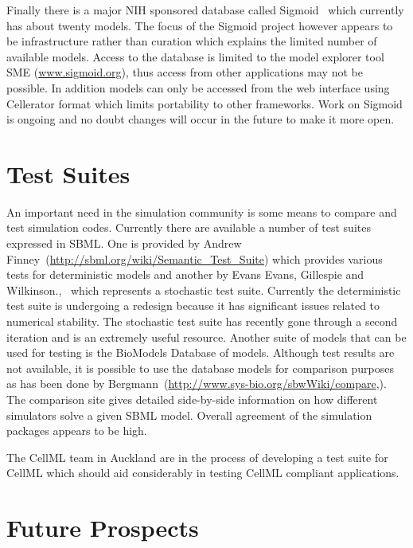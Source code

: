 \documentclass[12pt]{article}
\begin{document}
Finally there is a major NIH sponsored database called
Sigmoid~\citep{Sigmoid:2005} which currently has about twenty models.
The focus of the Sigmoid project however appears to be
infrastructure rather than curation which explains the limited
number of available models. Access to the database is limited to the
model explorer tool SME (\url{www.sigmoid.org}), thus access from other applications may not
be possible. In addition models can only be accessed from the web
interface using Cellerator format which limits portability to other
frameworks. Work on Sigmoid is ongoing and no doubt changes will
occur in the future to make it more open.

\section{Test Suites}

An important need in the simulation community is some means to
compare and test simulation codes. Currently there are available a
number of test suites expressed in SBML. One is provided by Andrew
Finney~(\url{http://sbml.org/wiki/Semantic_Test_Suite}) which
provides various tests for deterministic models and another by Evans
Evans, Gillespie and Wilkinson.,~\citep{Evans:2007} which represents a stochastic test suite.
Currently the deterministic test suite is undergoing a redesign
because it has significant issues related to numerical stability.
The stochastic test suite has recently gone through a second
iteration and is an extremely useful resource. Another suite of
models that can be used for testing is the BioModels Database of
models. Although test results are not available, it is possible to
use the database models for comparison purposes as has been done by
Bergmann~(\url{http://www.sys-bio.org/sbwWiki/compare},\citep{bergmann:2008}).
The comparison site gives detailed side-by-side information on how
different simulators solve a given SBML model. Overall agreement of
the simulation packages appears to be high.

The CellML team in Auckland are in the process of developing a test
suite for CellML which should aid considerably in testing CellML
compliant applications.


\section{Future Prospects}
\end{document}
